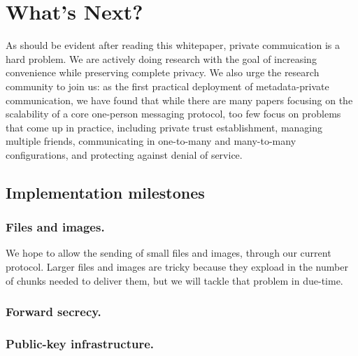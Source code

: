 \section{What's Next?}\label{sec:future}

As should be evident after reading this whitepaper, private commuication is a hard problem. We are actively doing research with the goal of increasing convenience while preserving complete privacy. We also urge the research community to join us: as the first practical deployment of metadata-private communication, we have found that while there are many papers focusing on the scalability of a core one-person messaging protocol, too few focus on problems that come up in practice, including private trust establishment, managing multiple friends, communicating in one-to-many and many-to-many configurations, and protecting against denial of service.


\subsection{Implementation milestones}


\subsubsection{Files and images.} We hope to allow the sending of small files and images, through our current protocol. Larger files and images are tricky because they expload in the number of chunks needed to deliver them, but we will tackle that problem in due-time.

\subsubsection{Forward secrecy.}

\subsubsection{Public-key infrastructure.}

